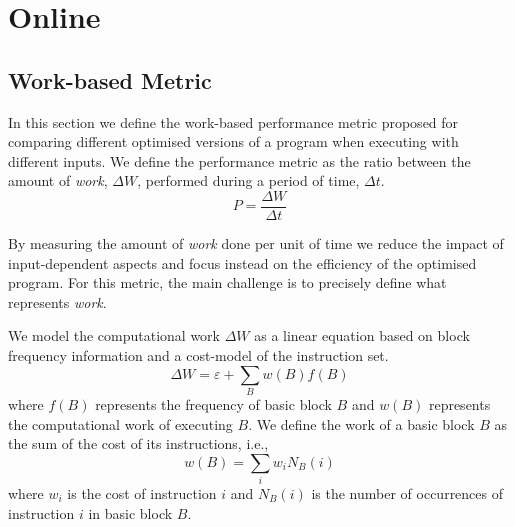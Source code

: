 
\chapter{Online {\IterComp}}

\section{Work-based Metric}\label{sec:metric}

In this section we define the work-based performance metric proposed for comparing different optimised versions of a program when executing with different inputs.
We define the performance metric as the ratio between the amount of \textit{work}, $\Delta W$, performed during a period of time, $\Delta t$.
\[
   P = \frac{\Delta W}{\Delta t}
\]

By measuring the amount of \textit{work} done per unit of time we reduce the impact of input-dependent aspects and focus instead on the efficiency of the optimised program.
For this metric, the main challenge is to precisely define what represents \textit{work}.



We model the computational work $\Delta W$ as a linear equation based on block frequency information and a cost-model of the instruction set.
\[
\Delta W = \varepsilon + \sum_{B} w(B)f(B)
\]
where $f(B)$ represents the frequency of basic block $B$ and $w(B)$ represents the computational work of executing $B$.
We define the work of a basic block $B$ as the sum of the cost of its instructions, i.e.,
\[
w(B) = \sum_{i} w_i N_B(i)
\]
where $w_i$ is the cost of instruction $i$ and $N_B(i)$ is the number of occurrences of instruction $i$ in basic block $B$.

